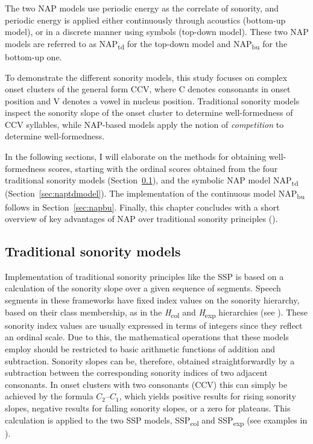 \begin{sloppypar}
The two NAP models use periodic energy as the correlate of sonority, and periodic energy is applied either continuously through acoustics (bottom-up model), or in a discrete manner using symbols (top-down model). These two NAP models are referred to as NAP\textsubscript{td} for the top-down model and NAP\textsubscript{bu} for the bottom-up one.
\end{sloppypar}

To demonstrate the different sonority models, this study focuses on complex onset clusters of the general form CCV, where C denotes consonants in onset position and V denotes a vowel in nucleus position. Traditional sonority models inspect the sonority slope of the onset cluster to determine well-formedness of CCV syllables, while NAP-based models apply the notion of \emph{competition} to determine well-formedness.

In the following sections, I will elaborate on the methods for obtaining well-formedness scores, starting with the ordinal scores obtained from the four traditional sonority models (Section~\ref{sec:traditionalmodels}), and the symbolic NAP model NAP\textsubscript{td} (Section~\ref{sec:naptdmodel}).
The implementation of the continuous model NAP\textsubscript{bu} follows in Section~\ref{sec:napbu}. Finally, this chapter concludes with a short overview of key advantages of NAP over traditional sonority principles ().

\subsection{Traditional sonority models}\label{sec:traditionalmodels}

Implementation of traditional sonority principles like the SSP is based on a calculation of the sonority slope over a given sequence of segments. Speech segments in these frameworks have fixed index values on the sonority hierarchy, based on their class membership, as in the \emph{H}\textsubscript{col} and \emph{H}\textsubscript{exp} hierarchies (see ). These sonority index values are usually expressed in terms of integers since they reflect an ordinal scale. Due to this, the mathematical operations that these models employ should be restricted to basic arithmetic functions of addition and subtraction. Sonority slopes can be, therefore, obtained straightforwardly by a subtraction between the corresponding sonority indices of two adjacent consonants. In onset clusters with two consonants (CCV) this can simply be achieved by the formula \(C_2 – C_1\), which yields positive results for rising sonority slopes, negative results for falling sonority slopes, or a zero for plateaus. This calculation is applied to the two SSP models, SSP\textsubscript{col} and SSP\textsubscript{exp} (see examples in ).

